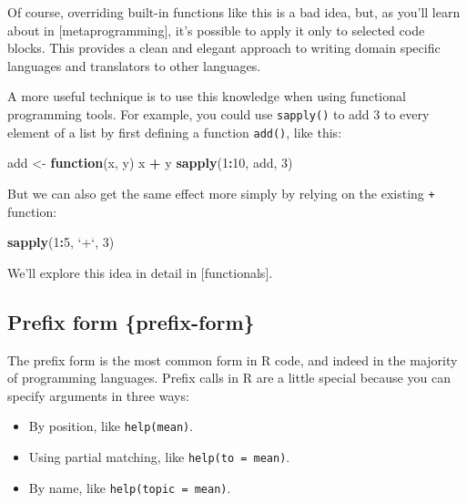 \documentclass[]{book}
\newenvironment{Shaded}{\begin{snugshade}}{\end{snugshade}}
\newcommand{\ControlFlowTok}[1]{\textcolor[rgb]{0.13,0.29,0.53}{\textbf{#1}}}
\newcommand{\DataTypeTok}[1]{\textcolor[rgb]{0.13,0.29,0.53}{#1}}
\newcommand{\DecValTok}[1]{\textcolor[rgb]{0.00,0.00,0.81}{#1}}
\newcommand{\KeywordTok}[1]{\textcolor[rgb]{0.13,0.29,0.53}{\textbf{#1}}}
\newcommand{\NormalTok}[1]{#1}
\newcommand{\OperatorTok}[1]{\textcolor[rgb]{0.81,0.36,0.00}{\textbf{#1}}}
\newcommand{\StringTok}[1]{\textcolor[rgb]{0.31,0.60,0.02}{#1}}
\providecommand{\tightlist}{%
  \setlength{\itemsep}{0pt}\setlength{\parskip}{0pt}}
\theoremstyle{definition}
\theoremstyle{definition}
\theoremstyle{definition}
\theoremstyle{remark}
\begin{document}
Of course, overriding built-in functions like this is a bad idea, but,
as you'll learn about in {[}metaprogramming{]}, it's possible to apply
it only to selected code blocks. This provides a clean and elegant
approach to writing domain specific languages and translators to other
languages.

A more useful technique is to use this knowledge when using functional
programming tools. For example, you could use \texttt{sapply()} to add 3
to every element of a list by first defining a function \texttt{add()},
like this:

\begin{Shaded}
\begin{Highlighting}[]
\NormalTok{add <-}\StringTok{ }\ControlFlowTok{function}\NormalTok{(x, y) x }\OperatorTok{+}\StringTok{ }\NormalTok{y}
\KeywordTok{sapply}\NormalTok{(}\DecValTok{1}\OperatorTok{:}\DecValTok{10}\NormalTok{, add, }\DecValTok{3}\NormalTok{)}
\end{Highlighting}
\end{Shaded}

But we can also get the same effect more simply by relying on the
existing \texttt{+} function:

\begin{Shaded}
\begin{Highlighting}[]
\KeywordTok{sapply}\NormalTok{(}\DecValTok{1}\OperatorTok{:}\DecValTok{5}\NormalTok{, }\StringTok{`}\DataTypeTok{+}\StringTok{`}\NormalTok{, }\DecValTok{3}\NormalTok{)}
\end{Highlighting}
\end{Shaded}

We'll explore this idea in detail in {[}functionals{]}.

\hypertarget{prefix-form-prefix-form}{%
\subsection{Prefix form \{prefix-form\}}\label{prefix-form-prefix-form}}

The prefix form is the most common form in R code, and indeed in the
majority of programming languages. Prefix calls in R are a little
special because you can specify arguments in three ways:

\begin{itemize}
\tightlist
\item
  By position, like \texttt{help(mean)}.
\item
  Using partial matching, like \texttt{help(to\ =\ mean)}.
\item
  By name, like \texttt{help(topic\ =\ mean)}.
\end{itemize}
\end{document}
